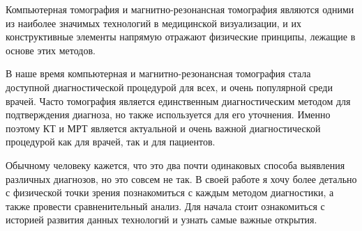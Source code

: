 Компьютерная томография и магнитно-резонансная томография являются одними из наиболее значимых технологий в медицинской визуализации, и их конструктивные элементы напрямую отражают физические принципы, лежащие в основе этих методов.

В наше время компьютерная и магнитно-резонансная томография стала доступной диагностической процедурой для всех, и очень популярной среди врачей. Часто томография является единственным диагностическим методом для подтверждения диагноза, но также используется для  его уточнения. Именно поэтому КТ и МРТ является актуальной и очень важной диагностической процедурой как для врачей, так и для пациентов.

Обычному человеку кажется, что это два почти одинаковых способа выявления различных диагнозов, но это совсем не так. В своей работе я хочу более детально с физической точки зрения познакомиться с каждым методом диагностики, а также провести сравненительный анализ. Для начала стоит ознакомиться с историей развития данных технологий и узнать самые важные открытия.